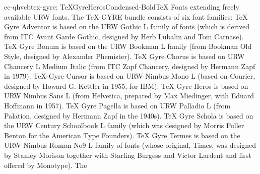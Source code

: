 \documentclass{ddltxtyp}
\begin{document}
\begin{package}{ec-qhvcb}{tex-gyre: TeXGyreHerosCondensed-Bold}{{\TeX} Fonts extending freely available URW fonts.}
The {\TeX}-GYRE bundle consists of six font families: {\TeX} Gyre
Adventor is based on the URW Gothic L family of fonts (which is
derived from ITC Avant Garde Gothic, designed by Herb Lubalin
and Tom Carnase). {\TeX} Gyre Bonum is based on the URW Bookman L
family (from Bookman Old Style, designed by Alexander
Phemister). {\TeX} Gyre Chorus is based on URW Chancery L Medium
Italic (from ITC Zapf Chancery, designed by Hermann Zapf in
1979). {\TeX}-Gyre Cursor is based on URW Nimbus Mono L (based on
Courier, designed by Howard G. Kettler in 1955, for IBM). {\TeX}
Gyre Heros is based on URW Nimbus Sans L (from Helvetica,
prepared by Max Miedinger, with Eduard Hoffmann in 1957). {\TeX}
Gyre Pagella is based on URW Palladio L (from Palation,
designed by Hermann Zapf in the 1940s). {\TeX} Gyre Schola is
based on the URW Century Schoolbook L family (which was
designed by Morris Fuller Benton for the American Type
Founders). {\TeX} Gyre Termes is based on the URW Nimbus Roman No9
L family of fonts (whose original, Times, was designed by
Stanley Morison together with Starling Burgess and Victor
Lardent and first offered by Monotype). The %
\end{package}
\end{document}
